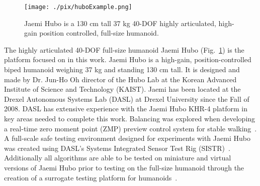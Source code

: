 \begin{figure}[t]
  \centering
\texttt{[image: ./pix/huboExample.png]}
  \caption{Jaemi Hubo is a 130 cm tall 37 kg 40-DOF highly articulated, high-gain position controlled, full-size humanoid.}
  \label{fig:huboFig}
\end{figure}


The highly articulated 40-DOF full-size humanoid Jaemi Hubo (Fig.~\ref{fig:huboFig}) is the platform focused on in this work.  Jaemi Hubo is a high-gain, position-controlled biped humanoid weighing 37 kg and standing 130 cm tall.  It is designed and made by Dr. Jun-Ho Oh director of the Hubo Lab at the Korean Advanced Institute of Science and Technology (KAIST).  Jaemi has been located at the Drexel Autonomous Systems Lab (DASL) at Drexel University since the Fall of 2008.  DASL has extensive experience with the Jaemi Hubo KHR-4 platform in key areas needed to complete this work.  Balancing was explored when developing a real-time zero moment point (ZMP) preview control system for stable walking~\cite{5686276}.  A full-scale safe testing environment designed for experiments with Jaemi Hubo was created using DASL's Systems Integrated Sensor Test Rig (SISTR)~\cite{5686325}.  Additionally all algorithms are able to be tested on miniature and virtual versions of Jaemi Hubo prior to testing on the full-size humanoid through the creation of a surrogate testing platform for humanoids~\cite{5379582}.





